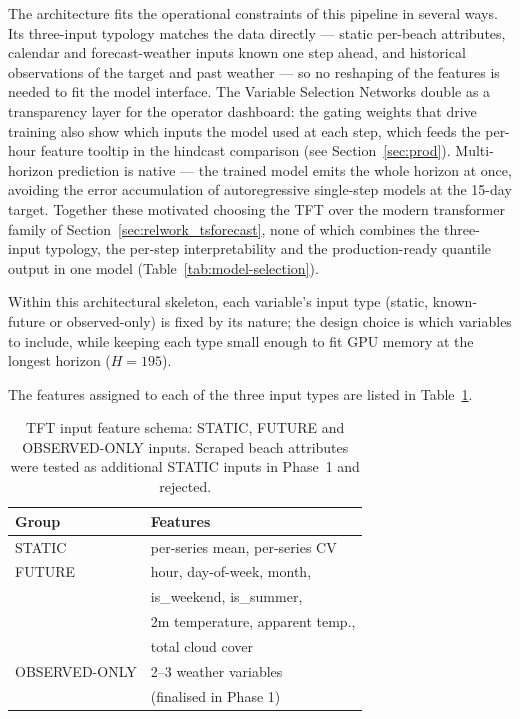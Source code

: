 \documentclass[twocolumn,twoside,a4paper,10pt]{IEEEtran}
\begin{document}
The architecture fits the operational constraints of this pipeline in several ways. Its three-input typology matches the data directly --- static per-beach attributes, calendar and forecast-weather inputs known one step ahead, and historical observations of the target and past weather --- so no reshaping of the features is needed to fit the model interface. The Variable Selection Networks double as a transparency layer for the operator dashboard: the gating weights that drive training also show which inputs the model used at each step, which feeds the per-hour feature tooltip in the hindcast comparison (see Section~\ref{sec:prod}). Multi-horizon prediction is native --- the trained model emits the whole horizon at once, avoiding the error accumulation of autoregressive single-step models at the 15-day target. Together these motivated choosing the TFT over the modern transformer family of Section~\ref{sec:relwork_tsforecast}, none of which combines the three-input typology, the per-step interpretability and the production-ready quantile output in one model (Table~\ref{tab:model-selection}).

Within this architectural skeleton, each variable's input type (static, known-future or observed-only) is fixed by its nature; the design choice is which variables to include, while keeping each type small enough to fit GPU memory at the longest horizon ($H{=}195$).

The features assigned to each of the three input types are listed in Table~\ref{tab:features}.

\begin{table}[!ht]
    \caption{TFT input feature schema: STATIC, FUTURE and OBSERVED-ONLY inputs. Scraped beach attributes were tested as additional STATIC inputs in Phase~1 and rejected.}
    \label{tab:features}
    \begin{center}
    \begin{tabular}{ll}
        \toprule
        Group & Features \\
        \midrule
        STATIC  & per-series mean, per-series CV \\
        FUTURE  & hour, day-of-week, month, \\
              & is\_weekend, is\_summer, \\
              & 2m temperature, apparent temp., \\
              & total cloud cover \\
        OBSERVED-ONLY  & 2--3 weather variables \\
              & (finalised in Phase 1) \\
        \bottomrule
    \end{tabular}
    \end{center}
\end{table}
\end{document}
